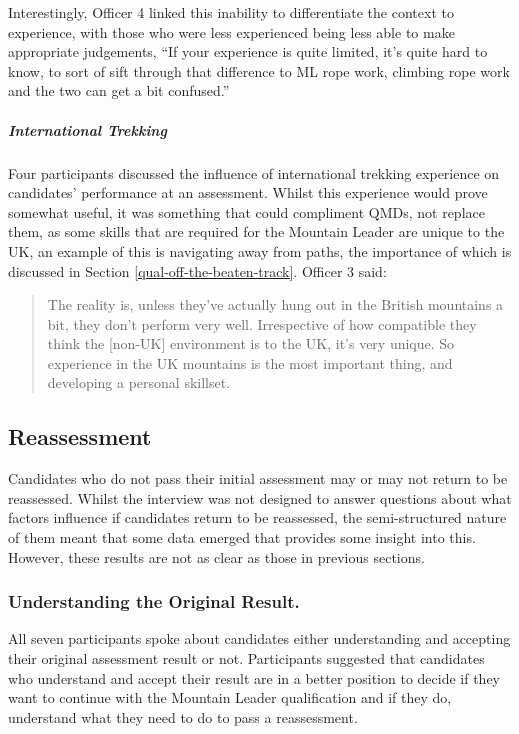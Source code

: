 \documentclass[
  12pt,
  a4paper,
]{book}
\begin{document}
Interestingly, Officer 4 linked this inability to differentiate the context to experience, with those who were less experienced being less able to make appropriate judgements, ``If your experience is quite limited, it's quite hard to know, to sort of sift through that difference to ML rope work, climbing rope work and the two can get a bit confused.''

\hypertarget{international-trekking}{%
\subparagraph{International Trekking}\label{international-trekking}}

Four participants discussed the influence of international trekking experience on candidates' performance at an assessment. Whilst this experience would prove somewhat useful, it was something that could compliment QMDs, not replace them, as some skills that are required for the Mountain Leader are unique to the UK, an example of this is navigating away from paths, the importance of which is discussed in Section \ref{qual-off-the-beaten-track}. Officer 3 said:

\begin{quote}
The reality is, unless they've actually hung out in the British mountains a bit, they don't perform very well. Irrespective of how compatible they think the {[}non-UK{]} environment is to the UK, it's very unique. So experience in the UK mountains is the most important thing, and developing a personal skillset.
\end{quote}

\hypertarget{reassessment}{%
\subsection{Reassessment}\label{reassessment}}

Candidates who do not pass their initial assessment may or may not return to be reassessed. Whilst the interview was not designed to answer questions about what factors influence if candidates return to be reassessed, the semi-structured nature of them meant that some data emerged that provides some insight into this. However, these results are not as clear as those in previous sections.

\hypertarget{understanding-the-original-result.}{%
\subsubsection{Understanding the Original Result.}\label{understanding-the-original-result.}}

All seven participants spoke about candidates either understanding and accepting their original assessment result or not. Participants suggested that candidates who understand and accept their result are in a better position to decide if they want to continue with the Mountain Leader qualification and if they do, understand what they need to do to pass a reassessment.
\end{document}
